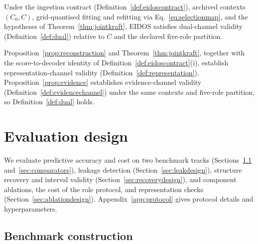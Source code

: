 \begin{corollary}\label{cor:dual}
Under the ingestion contract (Definition~\ref{def:eidoscontract}), archived contexts \((C_0,C)\), grid-quantised fitting and refitting via Eq.~\eqref{eq:selectionmap}, and the hypotheses of Theorem~\ref{thm:jointkraft}, EIDOS satisfies dual-channel validity (Definition~\ref{def:dual}) relative to \(C\) and the declared five-role partition.
\end{corollary}

\begin{pf}
Proposition~\ref{prop:reconstruction} and Theorem~\ref{thm:jointkraft}, together with the score-to-decoder identity of Definition~\ref{def:eidoscontract}(i), establish representation-channel validity (Definition~\ref{def:representation}). Proposition~\ref{prop:evidence} establishes evidence-channel validity (Definition~\ref{def:evidencechannel}) under the same contexts and five-role partition, so Definition~\ref{def:dual} holds.
\end{pf}

\FloatBarrier

\section{Evaluation design}\label{sec:experiments}

We evaluate predictive accuracy and cost on two benchmark tracks (Sections~\ref{sec:benchmark} and~\ref{sec:comparators}), leakage detection (Section~\ref{sec:leakdesign}), structure recovery and interval validity (Section~\ref{sec:recoverydesign}), and component ablations, the cost of the role protocol, and representation checks (Section~\ref{sec:ablationdesign}). Appendix~\ref{app:protocol} gives protocol details and hyperparameters.

\subsection{Benchmark construction}\label{sec:benchmark}

